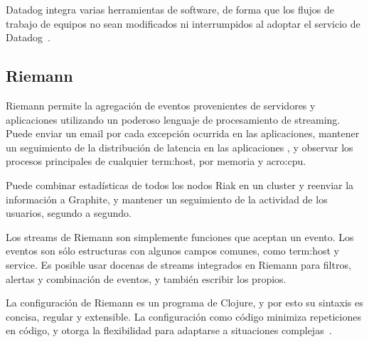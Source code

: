 Datadog integra varias herramientas de software, de forma que los flujos de
trabajo de equipos no sean modificados ni interrumpidos al adoptar el servicio
de Datadog~\cite{datadog}.

\subsection{Riemann}

Riemann permite la agregación de eventos provenientes de servidores y
aplicaciones utilizando un poderoso lenguaje de procesamiento de streaming.
Puede enviar un email por cada excepción ocurrida en las aplicaciones, mantener
un seguimiento de la distribución de latencia en las aplicaciones , y
observar los procesos principales de cualquier \gls{term:host}, por memoria y
\gls{acro:cpu}.

Puede combinar estadísticas de todos los nodos Riak en un cluster y reenviar la
información a Graphite, y mantener un seguimiento de la actividad de los
usuarios, segundo a segundo.

Los streams de Riemann son simplemente funciones que aceptan un evento. Los
eventos son sólo estructuras con algunos campos comunes, como \gls{term:host} y
service. Es posible usar docenas de streams integrados en Riemann para
filtros, alertas y combinación de eventos, y también escribir los propios.

La configuración de Riemann es un programa de Clojure, y por esto su sintaxis
es concisa, regular y extensible. La configuración como código minimiza
repeticiones en código, y otorga la flexibilidad para adaptarse a situaciones
complejas~\cite{riemann}.
